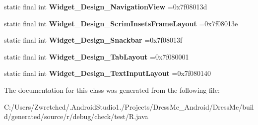 \begin{DoxyCompactItemize}
\item 
\hypertarget{classcheck_1_1test_1_1_r_1_1style_afca9abb7d79ac969cf6a327279c2e620}{}static final int {\bfseries Widget\+\_\+\+Design\+\_\+\+Navigation\+View} =0x7f08013d\label{classcheck_1_1test_1_1_r_1_1style_afca9abb7d79ac969cf6a327279c2e620}

\item 
\hypertarget{classcheck_1_1test_1_1_r_1_1style_a2162d38d0565304362b5d99e8f015dc3}{}static final int {\bfseries Widget\+\_\+\+Design\+\_\+\+Scrim\+Insets\+Frame\+Layout} =0x7f08013e\label{classcheck_1_1test_1_1_r_1_1style_a2162d38d0565304362b5d99e8f015dc3}

\item 
\hypertarget{classcheck_1_1test_1_1_r_1_1style_aa87f5403f42506756f1d69387c7400a7}{}static final int {\bfseries Widget\+\_\+\+Design\+\_\+\+Snackbar} =0x7f08013f\label{classcheck_1_1test_1_1_r_1_1style_aa87f5403f42506756f1d69387c7400a7}

\item 
\hypertarget{classcheck_1_1test_1_1_r_1_1style_a99472aa54559b857654c4d4101f19024}{}static final int {\bfseries Widget\+\_\+\+Design\+\_\+\+Tab\+Layout} =0x7f080001\label{classcheck_1_1test_1_1_r_1_1style_a99472aa54559b857654c4d4101f19024}

\item 
\hypertarget{classcheck_1_1test_1_1_r_1_1style_a22d53d9ec98f606a36b05398f4c0a2dc}{}static final int {\bfseries Widget\+\_\+\+Design\+\_\+\+Text\+Input\+Layout} =0x7f080140\label{classcheck_1_1test_1_1_r_1_1style_a22d53d9ec98f606a36b05398f4c0a2dc}

\end{DoxyCompactItemize}


The documentation for this class was generated from the following file\+:\begin{DoxyCompactItemize}
\item 
C\+:/\+Users/\+Zwretched/.\+Android\+Studio1./\+Projects/\+Dress\+Me\+\_\+\+Android/\+Dress\+Me/build/generated/source/r/debug/check/test/R.\+java\end{DoxyCompactItemize}
